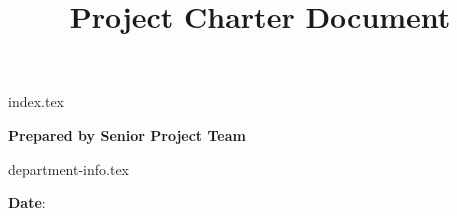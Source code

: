 \title{Project Charter Document}
\author{\TeamName}
\date{\DocumentDate}


\makeatletter
    \renewcommand{\maketitle}
    {%
        \noindent%
        \begin{center}
            {index.tex}%
            \begin{center}
                \setlength{\parskip}{2.0\baselineskip}
                \setlength{\parindent}{0pt}
                \vspace{\stretch{1}}
                \Large%
                \ClientName

                {\bfseries \MakeUppercase{\@title}}

                \textbf{Prepared by Senior Project Team} \\
                \@author

                {department-info.tex}

                \textbf{Date}: \@date
                \vspace{\stretch{1}}
            \end{center}
        \end{center}
    }

\makeatother


\maketitle
\thispagestyle{empty}
